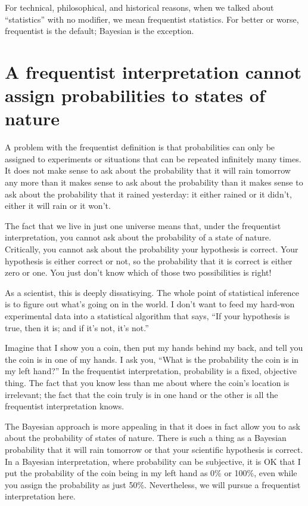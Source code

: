 For technical, philosophical, and historical reasons, when we talked about
``statistics'' with no modifier, we mean frequentist statistics. For better
or worse, frequentist is the default; Bayesian is the exception.

\section{A frequentist interpretation cannot assign probabilities to states of nature}

A problem with the frequentist definition is that probabilities can only
be assigned to experiments or situations that can be repeated infinitely many
times. It does not make sense to ask about the probability that it will rain
tomorrow any more than it makes sense to ask about the probability than it makes
sense to ask about the probability that it rained yesterday: it either rained or
it didn't, either it will rain or it won't.

The fact that we live in just one universe means that, under the frequentist 
interpretation, you cannot ask about the probability of a state of nature.
Critically, you cannot ask about the probability your hypothesis is correct.
Your hypothesis is either correct or not, so the probability that it is correct
is either zero or one. You just don't know which of those two possibilities is
right!

As a scientist, this is deeply dissatisying.  The whole point of statistical
inference is to figure out what's going on in the world. I don't want to feed
my hard-won experimental data into a statistical algorithm that says, ``If your
hypothesis is true, then it is; and if it's not, it's not.''

Imagine that I show you a coin, then put my hands behind my back, and tell you
the coin is in one of my hands. I ask you, ``What is the probability the coin
is in my left hand?'' In the frequentist interpretation, probability is a fixed,
objective thing. The fact that you know less than me about where the coin's
location is irrelevant; the fact that the coin truly is in one hand or the other
is all the frequentist interpretation knows.

The Bayesian approach is more appealing in that it does in fact allow you to
ask about the probability of states of nature. There is such a thing as a
Bayesian probability that it will rain tomorrow or that your scientific
hypothesis is correct. In a Bayesian interpretation, where
probability can be subjective, it is OK that I put the probability of the coin
being in my left hand as 0\% or 100\%, even while you assign the probability as
just 50\%. Nevertheless, we will pursue a frequentist interpretation here.


